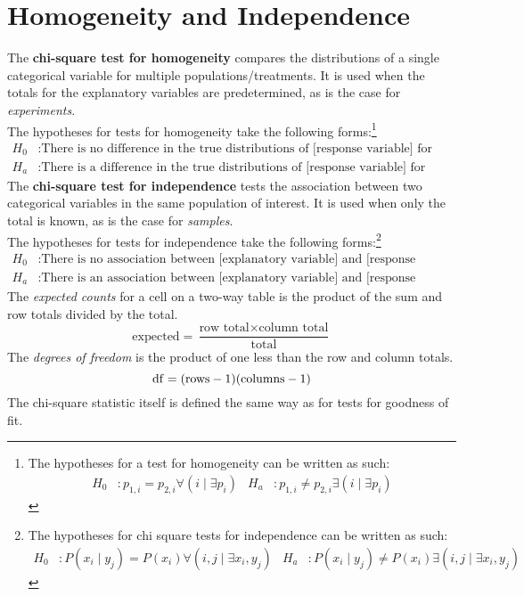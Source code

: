 \documentclass[../AP_Statistics.tex]{subfiles}
\begin{document}
		\section{Homogeneity and Independence}
			The \textbf{chi-square test for homogeneity} compares the distributions of a single categorical variable for multiple populations/treatments. It is used when the totals for the explanatory variables are predetermined, as is the case for \emph{experiments}. \\
			The hypotheses for tests for homogeneity take the following forms:\footnote{The hypotheses for a test for homogeneity can be written as such:
			\begin{align*}
				H_0&: p_{1, i} = p_{2, i} \forall (i \mid \exists p_i) & H_a&: p_{1, i} \ne p_{2, i} \exists (i \mid \exists p_i)
			\end{align*}}
			\begin{align*}
				H_0&: \text{There is no difference in the true distributions of [response variable] for [different populations]} \\
				H_a&: \text{There is a difference in the true distributions of [response variable] for [different populations]}
			\end{align*}
			The \textbf{chi-square test for independence} tests the association between two categorical variables in the same population of interest. It is used when only the total is known, as is the case for \emph{samples}. \\
			The hypotheses for tests for independence take the following forms:\footnote{The hypotheses for chi square tests for independence can be written as such:
			\begin{align*}
				H_0&: P(x_i \mid y_j) = P(x_i) \forall (i, j \mid \exists x_i, y_j) & H_a&: P(x_i \mid y_j) \ne P(x_i) \exists (i, j \mid \exists x_i, y_j)
			\end{align*}}
			\[\begin{aligned}
				H_0&: \text{There is no association between [explanatory variable] and [response variable]} \\
				H_a&: \text{There is an association between [explanatory variable] and [response variable]}
			\end{aligned}\]
			The \emph{expected counts} for a cell on a two-way table is the product of the sum and row totals divided by the total.
			\[\mathrm{expected = \frac{\text{row total} \times \text{column total}}{total}}\]
			The \emph{degrees of freedom} is the product of one less than the row and column totals.
			\[\mathrm{\operatorname{\mathrm{df}} = (rows - 1)(columns - 1)}\]
			The chi-square statistic itself is defined the same way as for tests for goodness of fit.
\end{document}
